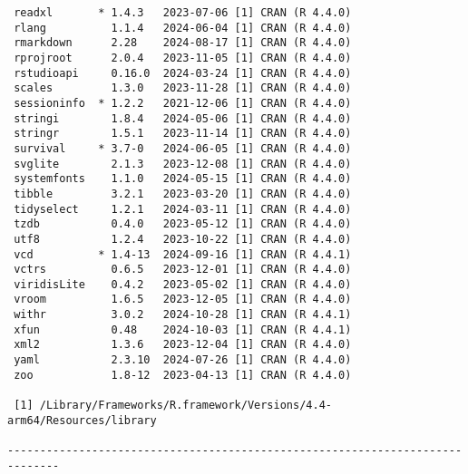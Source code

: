 \documentclass[
  letterpaper,
  DIV=11,
  numbers=noendperiod]{scrartcl}
\begin{document}
\begin{verbatim}
 readxl       * 1.4.3   2023-07-06 [1] CRAN (R 4.4.0)
 rlang          1.1.4   2024-06-04 [1] CRAN (R 4.4.0)
 rmarkdown      2.28    2024-08-17 [1] CRAN (R 4.4.0)
 rprojroot      2.0.4   2023-11-05 [1] CRAN (R 4.4.0)
 rstudioapi     0.16.0  2024-03-24 [1] CRAN (R 4.4.0)
 scales         1.3.0   2023-11-28 [1] CRAN (R 4.4.0)
 sessioninfo  * 1.2.2   2021-12-06 [1] CRAN (R 4.4.0)
 stringi        1.8.4   2024-05-06 [1] CRAN (R 4.4.0)
 stringr        1.5.1   2023-11-14 [1] CRAN (R 4.4.0)
 survival     * 3.7-0   2024-06-05 [1] CRAN (R 4.4.0)
 svglite        2.1.3   2023-12-08 [1] CRAN (R 4.4.0)
 systemfonts    1.1.0   2024-05-15 [1] CRAN (R 4.4.0)
 tibble         3.2.1   2023-03-20 [1] CRAN (R 4.4.0)
 tidyselect     1.2.1   2024-03-11 [1] CRAN (R 4.4.0)
 tzdb           0.4.0   2023-05-12 [1] CRAN (R 4.4.0)
 utf8           1.2.4   2023-10-22 [1] CRAN (R 4.4.0)
 vcd          * 1.4-13  2024-09-16 [1] CRAN (R 4.4.1)
 vctrs          0.6.5   2023-12-01 [1] CRAN (R 4.4.0)
 viridisLite    0.4.2   2023-05-02 [1] CRAN (R 4.4.0)
 vroom          1.6.5   2023-12-05 [1] CRAN (R 4.4.0)
 withr          3.0.2   2024-10-28 [1] CRAN (R 4.4.1)
 xfun           0.48    2024-10-03 [1] CRAN (R 4.4.1)
 xml2           1.3.6   2023-12-04 [1] CRAN (R 4.4.0)
 yaml           2.3.10  2024-07-26 [1] CRAN (R 4.4.0)
 zoo            1.8-12  2023-04-13 [1] CRAN (R 4.4.0)

 [1] /Library/Frameworks/R.framework/Versions/4.4-arm64/Resources/library

------------------------------------------------------------------------------
\end{verbatim}
\end{document}
